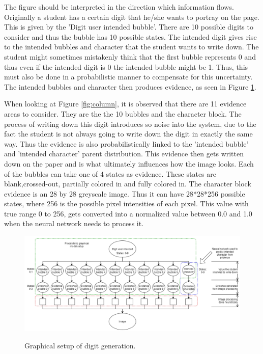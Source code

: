 The figure should be interpreted in the direction which information flows. Originally a student has a certain digit that he/she wants to portray on the page. This is given by the 'Digit user intended bubble'. There are 10 possible digits to consider and thus the bubble has 10 possible states. The intended digit gives rise to the intended bubbles and character that the student wants to write down. The student might sometimes mistakenly think that the first bubble represents 0 and thus even if the intended digit is 0 the intended bubble might be 1. Thus, this must also be done in a probabilistic manner to compensate for this uncertainty. The intended bubbles and character then produces evidence, as seen in Figure \ref{fig:pgmDigit}.  

When looking at Figure \ref{fig:column}, it is observed that there are 11 evidence areas to consider. They are the the 10 bubbles and the character block. The process of writing down this digit introduces so noise into the system, due to the fact the student is not always going to write down the digit in exactly the same way. Thus the evidence is also probabilistically linked to the 'intended bubble' and 'intended character' parent distribution. This evidence then gets written down on the paper and is what ultimately influences how the image looks. Each of the bubbles can take one of 4 states as evidence. These states are blank,crossed-out, partially colored in and fully colored in. The character block evidence is an 28 by 28 greyscale image. Thus it can have 28*28*256 possible states, where 256 is the possible pixel intensities of each pixel. This value with true range 0 to 256, gets converted into a normalized value between 0.0 and 1.0 when the neural network needs to process it.

\begin{figure}
  \centering
  \includegraphics[width=16cm]{pgmDigit}\\
  \caption{Graphical setup of digit generation.}
  \label{fig:pgmDigit}
\end{figure}

